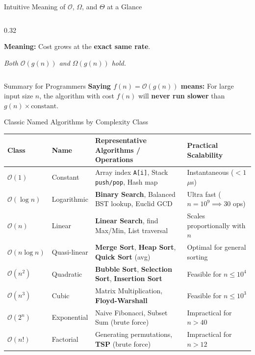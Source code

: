 \documentclass[aspectratio=169]{beamer}
\begin{document}
\begin{frame}{Intuitive Meaning of $\mathcal{O}$, $\Omega$, and $\Theta$ at a Glance}
\begin{columns}[T]
\begin{column}{0.32\textwidth}
\begin{tcolorbox}[colframe=ForestGreen,colback=SoftGreen!35,title={\centering\bfseries $\Theta(g(n))$: Tight Bound},arc=1.5mm]
        \textbf{Meaning:} Cost grows at the \textbf{exact same rate}.
        \vspace{0.3em}
        
        \textit{Both $\mathcal{O}(g(n))$ and $\Omega(g(n))$ hold.}
      \end{tcolorbox}
    \end{column}
  \end{columns}
  \vspace{0.3em}
  \begin{alertblock}{Summary for Programmers}
    \centering\scriptsize
    \textbf{Saying $f(n) = \mathcal{O}(g(n))$ means:} For large input size $n$, the algorithm with cost $f(n)$ will \textbf{never run slower} than $g(n) \times \text{constant}$.
  \end{alertblock}
\end{frame}

\begin{frame}{Classic Named Algorithms by Complexity Class}
  \centering\scriptsize
  \renewcommand{\arraystretch}{1.16}
  \begin{tabular}{l l p{4.6cm} p{3.4cm}}
    \toprule
    \textbf{Class} & \textbf{Name} & \textbf{Representative Algorithms / Operations} & \textbf{Practical Scalability} \\
    \midrule
    $\mathcal{O}(1)$ & Constant & Array index \texttt{A[i]}, Stack \texttt{push/pop}, Hash map & Instantaneous ($< 1$ $\mu$s) \\
    $\mathcal{O}(\log n)$ & Logarithmic & \textbf{Binary Search}, Balanced BST lookup, Euclid GCD & Ultra fast ($n=10^9 \implies 30$ ops) \\
    $\mathcal{O}(n)$ & Linear & \textbf{Linear Search}, find Max/Min, List traversal & Scales proportionally with $n$ \\
    $\mathcal{O}(n\log n)$ & Quasi-linear & \textbf{Merge Sort}, \textbf{Heap Sort}, \textbf{Quick Sort} (avg) & Optimal for general sorting \\
    $\mathcal{O}(n^2)$ & Quadratic & \textbf{Bubble Sort}, \textbf{Selection Sort}, \textbf{Insertion Sort} & Feasible for $n \le 10^4$ \\
    $\mathcal{O}(n^3)$ & Cubic & Matrix Multiplication, \textbf{Floyd-Warshall} & Feasible for $n \le 10^3$ \\
    $\mathcal{O}(2^n)$ & Exponential & Naive Fibonacci, Subset Sum (brute force) & Impractical for $n > 40$ \\
    $\mathcal{O}(n!)$ & Factorial & Generating permutations, \textbf{TSP} (brute force) & Impractical for $n > 12$ \\
    \bottomrule
  \end{tabular}
\end{frame}
\end{document}
